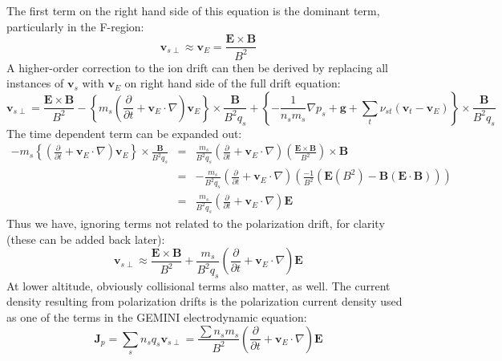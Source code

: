 \documentclass[11pt,letterpaper]{article}
\begin{document}
The first term on the right hand side of this equation is the dominant term, particularly in the F-region:
\begin{equation}
\mathbf{v}_{s\perp} \approx \mathbf{v}_{E} = \frac{\mathbf{E} \times \mathbf{B}}{B^2}
\end{equation}
A higher-order correction to the ion drift can then be derived by replacing all instances of $\mathbf{v}_s$ with $\mathbf{v}_E$ on right hand side of the full drift equation:
\begin{equation}
\mathbf{v}_{s\perp} = \frac{\mathbf{E} \times \mathbf{B}}{B^2} - \left\{ m_s \left( \frac{\partial }{\partial t}  + \mathbf{v}_{E} \cdot \nabla \right) \mathbf{v}_{E} \right\} \times \frac{\mathbf{B}}{B^2 q_s} + \left\{ - \frac{1}{n_s m_s} \nabla p_s + \mathbf{g} + \sum_t \nu_{st} \left(\mathbf{v}_t - \mathbf{v}_{E} \right) \right \} \times \frac{\mathbf{B}}{B^2 q_s}
\end{equation}
The time dependent term can be expanded out:  
\begin{eqnarray}
- m_s \left\{ \left( \frac{\partial }{\partial t}  + \mathbf{v}_{E} \cdot \nabla \right) \mathbf{v}_{E} \right\} \times \frac{\mathbf{B}}{B^2 q_s} &=& \frac{m_s}{B^2 q_s} \left( \frac{\partial }{\partial t}  + \mathbf{v}_{E} \cdot \nabla \right)  \left( \frac{\mathbf{E} \times \mathbf{B}}{B^2} \right) \times \mathbf{B} \\ &=& -\frac{m_s}{B^2 q_s} \left( \frac{\partial }{\partial t}  + \mathbf{v}_{E} \cdot \nabla \right)  \left( \frac{-1}{B^2} ( \mathbf{E} (B^2) - \mathbf{B} (\mathbf{E} \cdot \mathbf{B}) ) \right) \\ &=& \frac{m_s}{B^2 q_s} \left( \frac{\partial }{\partial t}  + \mathbf{v}_{E} \cdot \nabla \right) \mathbf{E}
\end{eqnarray}
Thus we have, ignoring terms not related to the polarization drift, for clarity (these can be added back later):
\begin{equation}
\mathbf{v}_{s\perp} \approx \frac{\mathbf{E} \times \mathbf{B}}{B^2} + \frac{m_s}{B^2 q_s} \left( \frac{\partial }{\partial t}  + \mathbf{v}_{E} \cdot \nabla \right) \mathbf{E}
\end{equation}
At lower altitude, obviously collisional terms also matter, as well.  The current density resulting from polarization drifts is the polarization current density used as one of the terms in the GEMINI electrodynamic equation:  
\begin{equation}
\mathbf{J}_p = \sum_s n_s q_s \mathbf{v}_{s\perp} = \frac{\sum n_s m_s }{B^2} \left( \frac{\partial }{\partial t}  + \mathbf{v}_{E} \cdot \nabla \right) \mathbf{E}
\end{equation}
\end{document}
